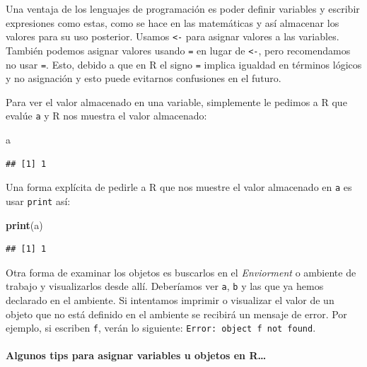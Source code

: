 \documentclass[
]{book}
\newenvironment{Shaded}{\begin{snugshade}}{\end{snugshade}}
\newcommand{\FunctionTok}[1]{\textcolor[rgb]{0.13,0.29,0.53}{\textbf{#1}}}
\newcommand{\NormalTok}[1]{#1}
\begin{document}
Una ventaja de los lenguajes de programación es poder definir variables y escribir expresiones como estas, como se hace en las matemáticas y así almacenar los valores para su uso posterior.
Usamos \texttt{\textless{}-} para asignar valores a las variables.
También podemos asignar valores usando \texttt{=} en lugar de \texttt{\textless{}-}, pero recomendamos no usar \texttt{=}.
Esto, debido a que en R el signo \texttt{=} implica igualdad en términos lógicos y no asignación y esto puede evitarnos confusiones en el futuro.

Para ver el valor almacenado en una variable, simplemente le pedimos a R que evalúe \texttt{a} y R nos muestra el valor almacenado:

\begin{Shaded}
\begin{Highlighting}[]
\NormalTok{a}
\end{Highlighting}
\end{Shaded}

\begin{verbatim}
## [1] 1
\end{verbatim}

Una forma explícita de pedirle a R que nos muestre el valor almacenado en \texttt{a} es usar \texttt{print} así:

\begin{Shaded}
\begin{Highlighting}[]
\FunctionTok{print}\NormalTok{(a)}
\end{Highlighting}
\end{Shaded}

\begin{verbatim}
## [1] 1
\end{verbatim}

Otra forma de examinar los objetos es buscarlos en el \emph{Enviorment} o ambiente de trabajo y visualizarlos desde allí.
Deberíamos ver \texttt{a}, \texttt{b} y las que ya hemos declarado en el ambiente.
Si intentamos imprimir o visualizar el valor de un objeto que no está definido en el ambiente se recibirá un mensaje de error.
Por ejemplo, si escriben \texttt{f}, verán lo siguiente: \texttt{Error:\ object\ \textquotesingle{}f\textquotesingle{}\ not\ found}.

\paragraph{Algunos tips para asignar variables u objetos en R\ldots{}}\label{algunos-tips-para-asignar-variables-u-objetos-en-r}
\end{document}
